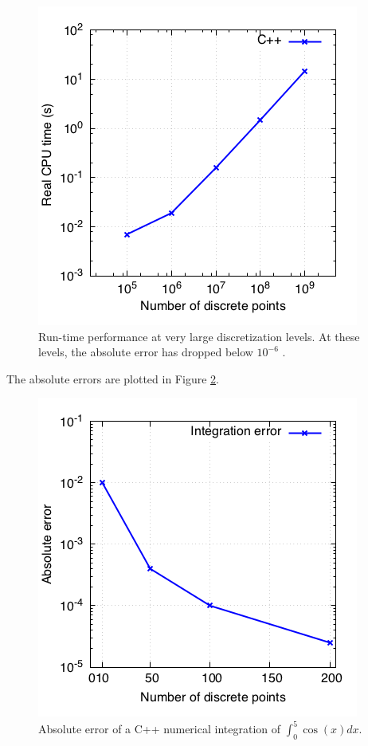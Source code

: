 \documentclass{article}
\begin{document}
  \begin{figure}[H]
  \begin{center}
  \includegraphics[scale=0.4]{Exc2.2/times_vs_largen.png}
  \caption{\small{Run-time performance at very large discretization levels. At these levels, the absolute error has dropped below $10^{-6}$ . }}
  \label{figure:largen}
  \end{center}
  \end{figure}
  
  The absolute errors are plotted in Figure \ref{fig:errors}. 
  \begin{figure}[H]
  \begin{center}
  \includegraphics[scale=0.4]{Exc2.2/error_vs_numPoints.png}
  \caption{\small{Absolute error of a C++ numerical integration of $ \int_0^5 \cos(x) dx. $}}
  \label{fig:errors}
  \end{center}
  \end{figure}
  
\end{document}
